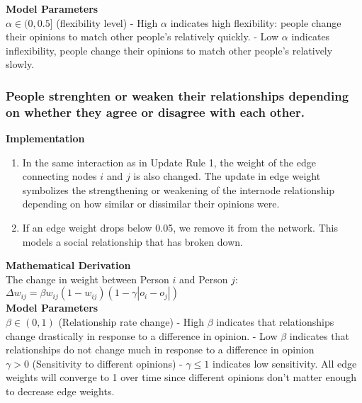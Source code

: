 \documentclass[11pt]{article}
\begin{document}
\textbf{Model Parameters}\\

\(\alpha \in (0,0.5]\) (flexibility level) - High \(\alpha\) indicates
high flexibility: people change their opinions to match other people's
relatively quickly. - Low \(\alpha\) indicates inflexibility, people
change their opinions to match other people's relatively slowly.

\subsubsection{People strenghten or weaken their relationships depending
on whether they agree or disagree with each other.}

\textbf{Implementation}

\begin{enumerate}
\def\labelenumi{\arabic{enumi})}
\item
  In the same interaction as in Update Rule 1, the weight of the edge
  connecting nodes \(i\) and \(j\) is also changed. The update in edge
  weight symbolizes the strengthening or weakening of the internode
  relationship depending on how similar or dissimilar their opinions
  were.
\item
  If an edge weight drops below 0.05, we remove it from the network.
  This models a social relationship that has broken down.
\end{enumerate}

\textbf{Mathematical Derivation}\\

The change in weight between Person \(i\) and Person \(j\):\\

\(\Delta w_{ij} = \beta w_{ij}(1-w_{ij})(1-\gamma |o_i-o_j|)\)\\

\textbf{Model Parameters}\\

\(\beta \in (0,1)\) (Relationship rate change) - High \(\beta\)
indicates that relationships change drastically in response to a
difference in opinion. - Low \(\beta\) indicates that relationships do
not change much in response to a difference in opinion\\

\(\gamma > 0\) (Sensitivity to different opinions) - \(\gamma \leq 1\)
indicates low sensitivity. All edge weights will converge to 1 over time
since different opinions don't matter enough to decrease edge weights. \\
\end{document}
